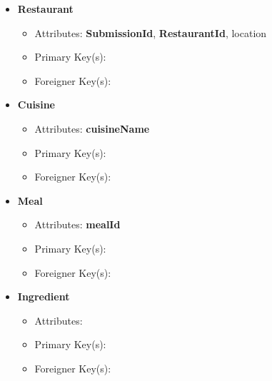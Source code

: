 \documentclass{article}
\begin{document}
\begin{itemize}
        \item \textbf{Restaurant}
        \begin{itemize}
            \item Attributes: \textbf{SubmissionId}, \textbf{RestaurantId}, location
            \item Primary Key(s): 
            \item Foreigner Key(s):
        \end{itemize}

        \item \textbf{Cuisine}
        \begin{itemize}
            \item Attributes: \textbf{cuisineName}
            \item Primary Key(s): 
            \item Foreigner Key(s):
        \end{itemize}

        \item \textbf{Meal}
        \begin{itemize}
            \item Attributes: \textbf{mealId}
            \item Primary Key(s): 
            \item Foreigner Key(s):
        \end{itemize}

        \item \textbf{Ingredient}
        \begin{itemize}
            \item Attributes:
            \item Primary Key(s): 
            \item Foreigner Key(s):
        \end{itemize}

    \end{itemize}    
    
\end{document}
